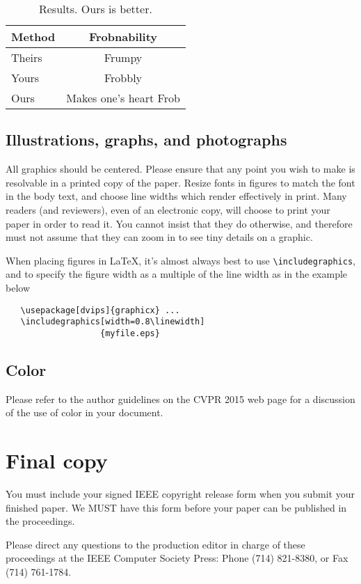 \documentclass[10pt,twocolumn,letterpaper]{article}
\begin{document}
\begin{table}
\begin{center}
\begin{tabular}{|l|c|}
\hline
Method & Frobnability \\
\hline\hline
Theirs & Frumpy \\
Yours & Frobbly \\
Ours & Makes one's heart Frob\\
\hline
\end{tabular}
\end{center}
\caption{Results.   Ours is better.}
\end{table}

\subsection{Illustrations, graphs, and photographs}

All graphics should be centered.  Please ensure that any point you wish to
make is resolvable in a printed copy of the paper.  Resize fonts in figures
to match the font in the body text, and choose line widths which render
effectively in print.  Many readers (and reviewers), even of an electronic
copy, will choose to print your paper in order to read it.  You cannot
insist that they do otherwise, and therefore must not assume that they can
zoom in to see tiny details on a graphic.

When placing figures in \LaTeX, it's almost always best to use
\verb+\includegraphics+, and to specify the  figure width as a multiple of
the line width as in the example below
{\small\begin{verbatim}
   \usepackage[dvips]{graphicx} ...
   \includegraphics[width=0.8\linewidth]
                   {myfile.eps}
\end{verbatim}
}


\subsection{Color}

Please refer to the author guidelines on the CVPR 2015 web page for a discussion
of the use of color in your document.

\section{Final copy}

You must include your signed IEEE copyright release form when you submit
your finished paper. We MUST have this form before your paper can be
published in the proceedings.

Please direct any questions to the production editor in charge of these
proceedings at the IEEE Computer Society Press: Phone (714) 821-8380, or
Fax (714) 761-1784.

{\small


}
\end{document}
